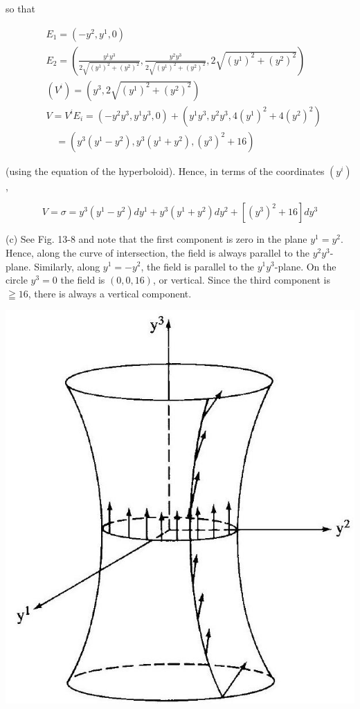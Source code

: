 \documentclass[10pt]{article}
\begin{document}
so that

$$
\begin{aligned}
& E_{1}=\left(-y^{2}, y^{1}, 0\right) \\
& E_{2}=\left(\frac{y^{1} y^{3}}{2 \sqrt{\left(y^{1}\right)^{2}+\left(y^{2}\right)^{2}}}, \frac{y^{2} y^{3}}{2 \sqrt{\left(y^{1}\right)^{2}+\left(y^{2}\right)^{2}}}, 2 \sqrt{\left(y^{1}\right)^{2}+\left(y^{2}\right)^{2}}\right) \\
& \left(V^{i}\right)=\left(y^{3}, 2 \sqrt{\left(y^{1}\right)^{2}+\left(y^{2}\right)^{2}}\right) \\
& V=V^{i} E_{i}=\left(-y^{2} y^{3}, y^{1} y^{3}, 0\right)+\left(y^{1} y^{3}, y^{2} y^{3}, 4\left(y^{1}\right)^{2}+4\left(y^{2}\right)^{2}\right) \\
& \quad=\left(y^{3}\left(y^{1}-y^{2}\right), y^{3}\left(y^{1}+y^{2}\right),\left(y^{3}\right)^{2}+16\right)
\end{aligned}
$$

(using the equation of the hyperboloid). Hence, in terms of the coordinates $\left(y^{i}\right)$,

$$
V=\sigma=y^{3}\left(y^{1}-y^{2}\right) d y^{1}+y^{3}\left(y^{1}+y^{2}\right) d y^{2}+\left[\left(y^{3}\right)^{2}+16\right] d y^{3}
$$

(c) See Fig. 13-8 and note that the first component is zero in the plane $y^{1}=y^{2}$. Hence, along the curve of intersection, the field is always parallel to the $y^{2} y^{3}$-plane. Similarly, along $y^{1}=-y^{2}$, the field is parallel to the $y^{1} y^{3}$-plane. On the circle $y^{3}=0$ the field is $(0,0,16)$, or vertical. Since the third component is $\geqq 16$, there is always a vertical component.

\begin{center}
\includegraphics[max width=\textwidth]{2024_04_03_41f90be4f896e21f0dc9g-217}
\end{center}
\end{document}
